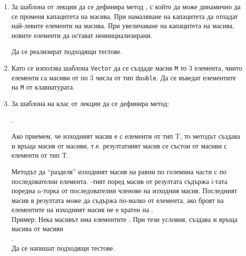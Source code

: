 \begin{enumerate}[resume]
\item За шаблона  от лекции да се дефинира метод , с който да може динамично да се променя капацитета на масива. При намаляване на капацитета да отпадат най-левите елементи на масива. При увеличаване на капацитета на масива, новите елементи да остават неинициализирани.

Да се реализират подходящи тестове.

\item \label{zad:vectm} Като се използва шаблона \texttt{Vector} да се създаде масив \texttt{M} то 3 елемента, чиито елементи са масиви от по 3 числа от тип \texttt{double}. Да се въведат елементите на \texttt{M} от клавиатурата.


\item За шаблона на клас  от лекции да се дефинира метод:

 .

 Ако приемем, че изходният масив е  с елементи от тип T, то методът  създава и връща масив от масиви, т.е. резултатният масив се състои от масиви с елементи от тип T.

 Методът да ``разделя'' изходният масив на равни по големина части с по  последователни елемента. -тият поред масив от резултата съдържа i-тата поредна n-торка от последователни членове на изходния масив. Последният масив в резултата може да съдържа по-малко от  елемента, ако броят на елементите на изходният масив не е кратен на .\\

Пример: Нека масивът  има елементите \code{[1,2,3,4,5,6,7,8,10,11]}. При тези условия,  създава и връща масива от масиви\\ \code{[[1,2,3],[4,5,6],[7,8,9],[10,11]]}.\\


Да се напишат подходящи тестове.




\end{enumerate}
